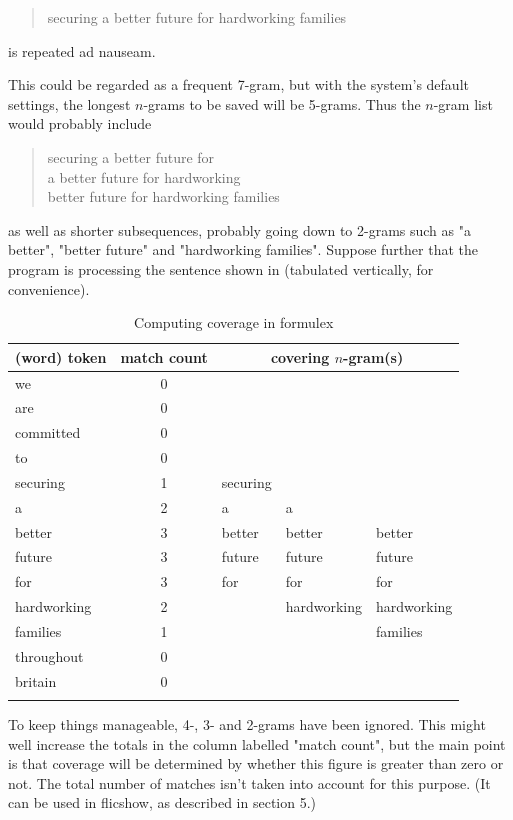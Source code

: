 \documentclass[output=paper]{langscibook}
\begin{document}
\begin{quote}
securing a better future for hardworking families
\end{quote}
is repeated ad nauseam.

This could be regarded as a frequent 7-gram, but with the system's default settings, the longest $n$-grams to be saved will be 5-grams. Thus the $n$-gram list would probably include

\begin{quote}
securing a better future for\\
a better future for hardworking\\
better future for hardworking families
\end{quote}
as well as shorter subsequences, probably going down to 2-grams such as "a better", "better future" and "hardworking families". Suppose further that the program is processing the sentence shown in  (tabulated vertically, for convenience).

\begin{table}
\caption{Computing coverage in formulex\label{tab:4}}
\begin{tabular}{lclll}
\lsptoprule
(word) token & match count & \multicolumn{3}{c}{covering $n$-gram(s)}\\\midrule
we          & 0 &  &  & \\
are         & 0 &  &  & \\
committed   & 0 &  &  & \\
to          & 0 &  &  & \\
securing    & 1 & securing &  & \\
a           & 2 & a & a & \\
better      & 3 & better & better & better\\
future      & 3 & future & future & future\\
for         & 3 & for & for & for\\
hardworking & 2 &  & hardworking & hardworking\\
families    & 1 &  &  & families\\
throughout  & 0 &  &  & \\
britain     & 0 &  &  & \\
\lspbottomrule
\end{tabular}
\end{table}

To keep things manageable, 4-, 3- and 2-grams have been ignored. This might well increase the totals in the column labelled "match count", but the main point is that coverage will be determined by whether this figure is greater than zero or not. The total number of matches isn't taken into account for this purpose. (It can be used in flicshow, as described in section 5.)
\end{document}
